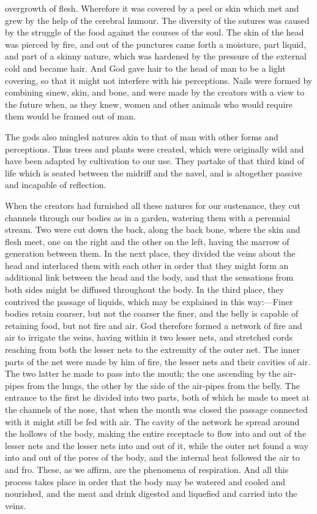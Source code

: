 \documentclass[11pt,letter]{article}
\begin{document}
overgrowth of flesh. Wherefore it was covered by a peel or skin which met and grew by the help of the cerebral humour. The diversity of the sutures was caused by the struggle of the food against the courses of the soul. The skin of the head was pierced by fire, and out of the punctures came forth a moisture, part liquid, and part of a skinny nature, which was hardened by the pressure of the external cold and became hair. And God gave hair to the head of man to be a light covering, so that it might not interfere with his perceptions. Nails were formed by combining sinew, skin, and bone, and were made by the creators with a view to the future when, as they knew, women and other animals who would require them would be framed out of man.

\par  The gods also mingled natures akin to that of man with other forms and perceptions. Thus trees and plants were created, which were originally wild and have been adapted by cultivation to our use. They partake of that third kind of life which is seated between the midriff and the navel, and is altogether passive and incapable of reflection.

\par  When the creators had furnished all these natures for our sustenance, they cut channels through our bodies as in a garden, watering them with a perennial stream. Two were cut down the back, along the back bone, where the skin and flesh meet, one on the right and the other on the left, having the marrow of generation between them. In the next place, they divided the veins about the head and interlaced them with each other in order that they might form an additional link between the head and the body, and that the sensations from both sides might be diffused throughout the body. In the third place, they contrived the passage of liquids, which may be explained in this way:—Finer bodies retain coarser, but not the coarser the finer, and the belly is capable of retaining food, but not fire and air. God therefore formed a network of fire and air to irrigate the veins, having within it two lesser nets, and stretched cords reaching from both the lesser nets to the extremity of the outer net. The inner parts of the net were made by him of fire, the lesser nets and their cavities of air. The two latter he made to pass into the mouth; the one ascending by the air-pipes from the lungs, the other by the side of the air-pipes from the belly. The entrance to the first he divided into two parts, both of which he made to meet at the channels of the nose, that when the mouth was closed the passage connected with it might still be fed with air. The cavity of the network he spread around the hollows of the body, making the entire receptacle to flow into and out of the lesser nets and the lesser nets into and out of it, while the outer net found a way into and out of the pores of the body, and the internal heat followed the air to and fro. These, as we affirm, are the phenomena of respiration. And all this process takes place in order that the body may be watered and cooled and nourished, and the meat and drink digested and liquefied and carried into the veins.
\end{document}
